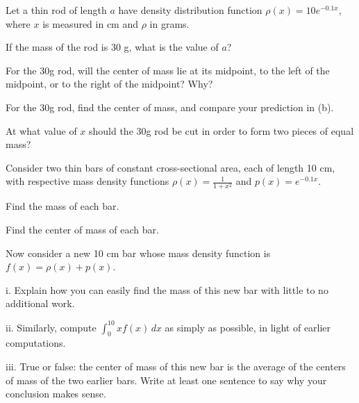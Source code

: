\begin{exercises} 
  \item Let a thin rod of length $a$ have density distribution function $\rho(x) = 10e^{-0.1x}$, where $x$ is measured in cm and $\rho$ in grams.
  \ba
  	\item If the mass of the rod is 30 g, what is the value of $a$?
	\item For the 30g rod, will the center of mass lie at its midpoint, to the left of the midpoint, or to the right of the midpoint?  Why?
	\item For the 30g rod, find the center of mass, and compare your prediction in (b).
	\item At what value of $x$ should the 30g rod be cut in order to form two pieces of equal mass? 
  \ea
  
  \item Consider two thin bars of constant cross-sectional area, each of length 10 cm, with respective mass density functions $\rho(x) = \frac{1}{1+x^2}$ and $p(x) = e^{-0.1x}$.
  \ba
  	\item Find the mass of each bar.
	\item Find the center of mass of each bar.
	\item Now consider a new 10 cm bar whose mass density function is $f(x) = \rho(x) + p(x)$.  
	\be
		\item[i.]  Explain how you can easily find the mass of this new bar with little to no additional work.
		\item[ii.]  Similarly, compute $\int_0^{10} xf(x) \, dx$ as simply as possible, in light of earlier computations.
		\item[iii.]  True or false:  the center of mass of this new bar is the average of the centers of mass of the two earlier bars.  Write at least one sentence to say why your conclusion makes sense.
	\ee
  \ea
  

\end{exercises}
